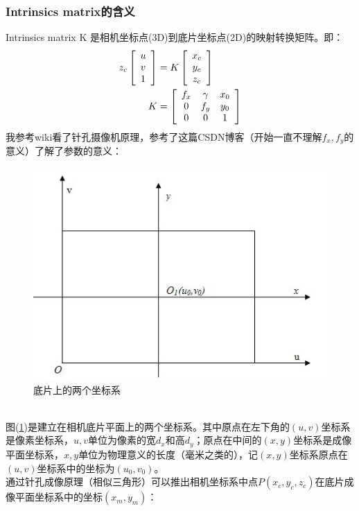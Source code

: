 \documentclass[UTF8]{ctexart}
\begin{document}
\subsubsection{Intrinsics matrix的含义}
Intrinsics matrix K 是相机坐标点(3D)到底片坐标点(2D)的映射转换矩阵。即：
\begin{align}
 z_c \left[ \begin{array}{c}  u \\ v \\ 1 \end{array} \right] &=
 K \left[ \begin{array}{c}   x_c \\  y_c \\  z_c  \end{array}\right]\\
K &= \left [ \begin{array}{ c c c}
f_x & \gamma   & x_0 \\
0  & f_y & y_0 \\
0  & 0   & 1 \\
\end{array} \right ]
\end{align}
我参考wiki\cite{Pinholecameramodel18830}看了针孔摄像机原理，参考了这篇CSDN博客\cite{CSDNJessicajiel18830}（开始一直不理解$f_x,f_y$的意义）了解了参数的意义：
\begin{figure}[htp]%
	\centering  %
	\includegraphics[width=0.5\linewidth]{./figures/twocor.jpg} %
	\caption{底片上的两个坐标系}  %
	\label{fig:twocor}   %
\end{figure}\\
图(\ref{fig:twocor})是建立在相机底片平面上的两个坐标系。其中原点在左下角的$(u,v)$坐标系是像素坐标系，$u,v$单位为像素的宽$d_x$和高$d_y$；原点在中间的$(x,y)$坐标系是成像平面坐标系，$x,y$单位为物理意义的长度（毫米之类的），记$(x,y)$坐标系原点在$(u,v)$坐标系中的坐标为$(u_0,v_0)$。\\
通过\cite{Pinholecameramodel18830}针孔成像原理（相似三角形）可以推出相机坐标系中点$P(x_c,y_c,z_c)$在底片成像平面坐标系中的坐标$(x_m,y_m)$：
\end{document}
